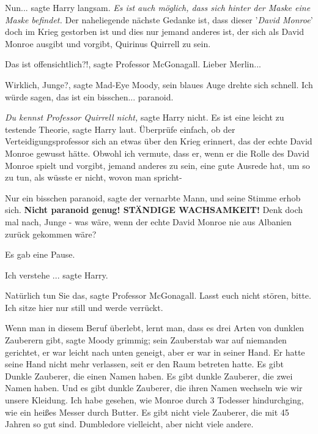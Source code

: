 \glqq{}Nun...\grqq{} sagte Harry langsam.
\emph{Es ist auch möglich, dass sich hinter der Maske eine Maske befindet.}
\glqq{}Der naheliegende nächste Gedanke ist, dass dieser '\emph{David Monroe}'
doch im Krieg gestorben ist und dies nur jemand anderes ist, der sich als David
Monroe ausgibt und vorgibt, Quirinus Quirrell zu sein.\grqq{}

\glqq{}Das ist offensichtlich?!\grqq{}, sagte Professor McGonagall. \glqq{}Lieber
Merlin...\grqq{}

\glqq{}Wirklich, Junge?\grqq{}, sagte Mad-Eye Moody, sein blaues Auge drehte sich
schnell. \glqq{}Ich würde sagen, das ist ein bisschen... paranoid.\grqq{}

\emph{Du kennst Professor Quirrell nicht,} sagte Harry nicht. \glqq{}Es ist eine
leicht zu testende Theorie\grqq{}, sagte Harry laut. \glqq{}Überprüfe einfach, ob
der Verteidigungsprofessor sich an etwas über den Krieg erinnert, das der echte
David Monroe gewusst hätte. Obwohl ich vermute, dass er, wenn er die Rolle des
David Monroe spielt und vorgibt, jemand anderes zu sein, eine gute Ausrede hat,
um so zu tun, als wüsste er nicht, wovon man spricht-\grqq{}

\glqq{}Nur ein bisschen paranoid\grqq{}, sagte der vernarbte Mann, und seine
Stimme erhob sich. \glqq{}\textbf{Nicht paranoid genug! STÄNDIGE WACHSAMKEIT!}
Denk doch mal nach, Junge - was wäre, wenn der echte David Monroe nie aus
Albanien zurück gekommen wäre?\grqq{}

Es gab eine Pause.

\glqq{}Ich verstehe ...\grqq{} sagte Harry.

\glqq{}Natürlich tun Sie das\grqq{}, sagte Professor McGonagall. \glqq{}Lasst euch
nicht stören, bitte. Ich sitze hier nur still und werde verrückt.\grqq{}

\glqq{}Wenn man in diesem Beruf überlebt, lernt man, dass es drei Arten von
dunklen Zauberern gibt\grqq{}, sagte Moody grimmig; sein Zauberstab war auf
niemanden gerichtet, er war leicht nach unten geneigt, aber er war in seiner
Hand. Er hatte seine Hand nicht mehr verlassen, seit er den Raum betreten hatte.
\glqq{}Es gibt Dunkle Zauberer, die einen Namen haben. Es gibt dunkle Zauberer,
die zwei Namen haben. Und es gibt dunkle Zauberer, die ihren Namen wechseln wie
wir unsere Kleidung. Ich habe gesehen, wie \glqq{}Monroe\grqq{} durch 3 Todesser
hindurchging, wie ein heißes Messer durch Butter. Es gibt nicht viele Zauberer,
die mit 45 Jahren so gut sind. Dumbledore vielleicht, aber nicht viele
andere.\grqq{}

